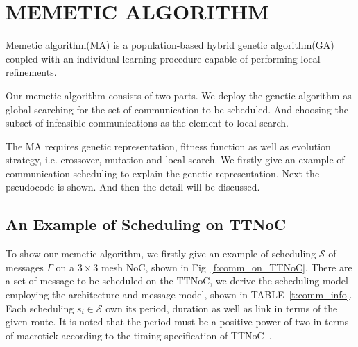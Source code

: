 \documentclass[journal]{IEEEtran}
\newcommand{\calS}{\mathcal{S}}
\begin{document}



\section{MEMETIC ALGORITHM\label{s:algorithm}}

Memetic algorithm(MA) is a population-based hybrid genetic algorithm(GA) coupled with an individual learning procedure capable of performing local refinements\cite{DBLP:journals/cim/OngLC10}. 

Our memetic algorithm consists of two parts. We deploy the genetic algorithm as global searching for the set of communication to be scheduled. And choosing the subset of infeasible communications as the element to local search.

The MA requires genetic representation, fitness function as well as evolution strategy, i.e. crossover, mutation and local search. We firstly give an example of communication scheduling to explain the genetic representation. Next the pseudocode is shown. And then the detail will be discussed.
\subsection{An Example of Scheduling on TTNoC}

To show our memetic algorithm,
 we firstly give an example of scheduling $\calS$ of messages $\Gamma$ on a $3\times 3$ mesh NoC,
 shown in Fig~\ref{f:comm_on_TTNoC}. 
There are a set of message to be scheduled on the TTNoC,
 we derive the scheduling model employing the architecture and message model,
 shown in TABLE~\ref{t:comm_info}.
Each scheduling $s_i\in\calS$ own its period, duration as well as link in terms of the given route.
It is noted that the period must be a positive power of two in terms of macrotick according to the timing specification of TTNoC~\cite{DBLP:conf/date/HuangBRBK12}.
\end{document}
